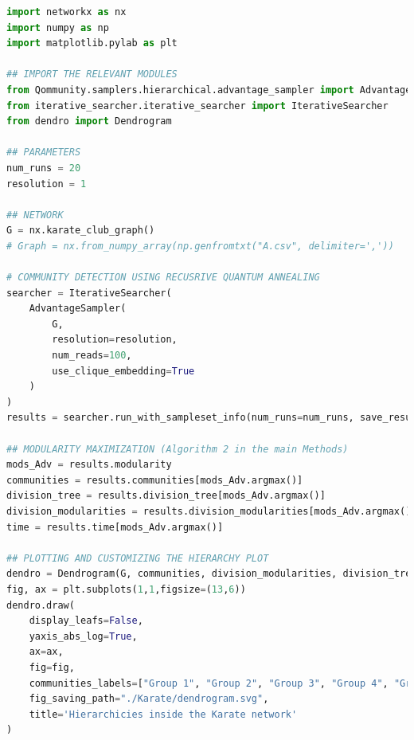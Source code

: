 \documentclass[pdflatex,sn-mathphys-num]{sn-jnl}%
\begin{document}
\begin{lstlisting}[language=Python, caption=Example to obtain the hierarchical structure of a given network using modularity maximization., label=python2]
import networkx as nx
import numpy as np
import matplotlib.pylab as plt

## IMPORT THE RELEVANT MODULES
from Qommunity.samplers.hierarchical.advantage_sampler import AdvantageSampler
from iterative_searcher.iterative_searcher import IterativeSearcher
from dendro import Dendrogram

## PARAMETERS
num_runs = 20
resolution = 1

## NETWORK
G = nx.karate_club_graph()
# Graph = nx.from_numpy_array(np.genfromtxt("A.csv", delimiter=','))

# COMMUNITY DETECTION USING RECUSRIVE QUANTUM ANNEALING
searcher = IterativeSearcher(
    AdvantageSampler(
        G, 
        resolution=resolution, 
        num_reads=100, 
        use_clique_embedding=True
    )
)
results = searcher.run_with_sampleset_info(num_runs=num_runs, save_results=False, saving_path=None, iterative_verbosity=0)

## MODULARITY MAXIMIZATION (Algorithm 2 in the main Methods)
mods_Adv = results.modularity
communities = results.communities[mods_Adv.argmax()]
division_tree = results.division_tree[mods_Adv.argmax()]
division_modularities = results.division_modularities[mods_Adv.argmax()]
time = results.time[mods_Adv.argmax()]

## PLOTTING AND CUSTOMIZING THE HIERARCHY PLOT
dendro = Dendrogram(G, communities, division_modularities, division_tree)
fig, ax = plt.subplots(1,1,figsize=(13,6))
dendro.draw(
    display_leafs=False,
    yaxis_abs_log=True,
    ax=ax,
    fig=fig,
    communities_labels=["Group 1", "Group 2", "Group 3", "Group 4", "Group 5", "Group 6", "Group 7", "Group 8"],
    fig_saving_path="./Karate/dendrogram.svg",
    title='Hierarchicies inside the Karate network'
)
\end{lstlisting}

\end{document}

